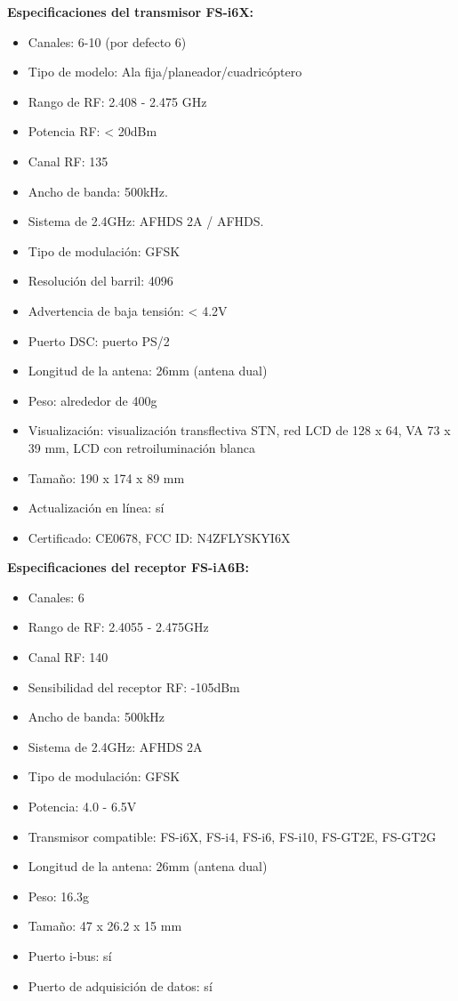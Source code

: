 \textbf{Especificaciones del transmisor FS-i6X:}
\begin{itemize}[itemsep=0pt, parsep=0pt, topsep=0pt, partopsep=0pt]
    \item Canales: 6-10 (por defecto 6)
    \item Tipo de modelo: Ala fija/planeador/cuadricóptero
    \item Rango de RF: 2.408 - 2.475 GHz
    \item Potencia RF: < 20dBm
    \item Canal RF: 135
    \item Ancho de banda: 500kHz.
    \item Sistema de 2.4GHz: AFHDS 2A / AFHDS.
    \item Tipo de modulación: GFSK
    \item Resolución del barril: 4096
    \item Advertencia de baja tensión: < 4.2V
    \item Puerto DSC: puerto PS/2
    \item Longitud de la antena: 26mm (antena dual)
    \item Peso: alrededor de 400g
    \item Visualización: visualización transflectiva STN, red LCD de 128 x 64, VA 73 x 39 mm, LCD con retroiluminación blanca
    \item Tamaño: 190 x 174 x 89 mm
    \item Actualización en línea: sí
    \item Certificado: CE0678, FCC ID: N4ZFLYSKYI6X
\end{itemize}
\textbf{Especificaciones del receptor FS-iA6B:}
\begin{itemize}[itemsep=0pt, parsep=0pt, topsep=0pt, partopsep=0pt]
    \item Canales: 6
    \item Rango de RF: 2.4055 - 2.475GHz
    \item Canal RF: 140
    \item Sensibilidad del receptor RF: -105dBm
    \item Ancho de banda: 500kHz
    \item Sistema de 2.4GHz: AFHDS 2A
    \item Tipo de modulación: GFSK
    \item Potencia: 4.0 - 6.5V
    \item Transmisor compatible: FS-i6X, FS-i4, FS-i6, FS-i10, FS-GT2E, FS-GT2G
    \item Longitud de la antena: 26mm (antena dual)
    \item Peso: 16.3g
    \item Tamaño: 47 x 26.2 x 15 mm
    \item Puerto i-bus: sí
    \item Puerto de adquisición de datos: sí
\end{itemize}


